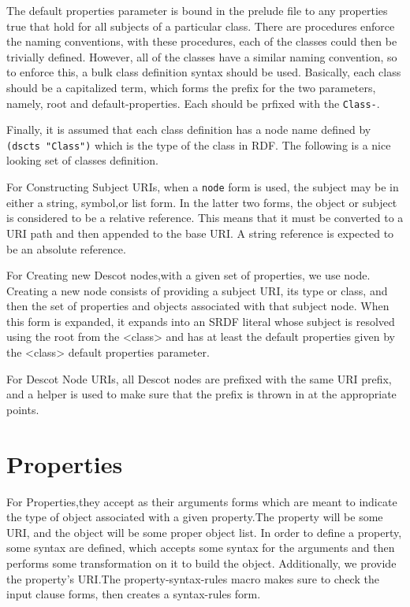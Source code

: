The default properties parameter is bound in the prelude file to 
any properties true that hold for all subjects of a particular class.
There are procedures enforce the naming conventions, with these procedures, 
each of the classes could then be trivially defined. However, all of the
classes have a similar naming convention, so to enforce this, a bulk class 
definition syntax should be used. Basically, each class should be a 
capitalized term, which forms the prefix for the two parameters, namely, 
root and default-properties. Each should be prfixed with the {\tt Class-}.

Finally, it is assumed that each class definition has a node name defined 
by {\tt (dscts "Class")} which is the type of the class in RDF.
The following is a nice looking set of classes definition.

For Constructing Subject URIs, when a {\tt node} form is used, the subject
may be in either a string, symbol,or list form. In the latter two forms, 
the object or subject is considered to be a relative reference. This
means that it must be converted to a URI path and then appended to the 
base URI. A string reference is expected to be an absolute reference.

For Creating new Descot nodes,with a given set of properties, we use node.
Creating a new node consists of providing a subject URI, its type or class, 
and then the set of properties and objects associated with that subject node.
When this form is expanded, it expands into an SRDF literal whose subject 
is resolved using the root from the <class> and has at least the default 
properties given by the <class> default properties parameter.

For Descot Node URIs, all Descot nodes are prefixed with the same URI 
prefix, and a helper is used to make sure that the prefix is thrown in 
at the appropriate points.

\section{Properties}{}%
For Properties,they accept as their arguments forms which are meant to 
indicate the type of object associated with a given property.The property 
will be some URI, and the object will be some proper object list. In order 
to define a property, some syntax are defined, which accepts some 
syntax for the arguments and then performs some transformation on it to 
build the object. Additionally, we provide the property's URI.The 
property-syntax-rules macro makes sure to check the input clause forms,
then creates a syntax-rules form.

